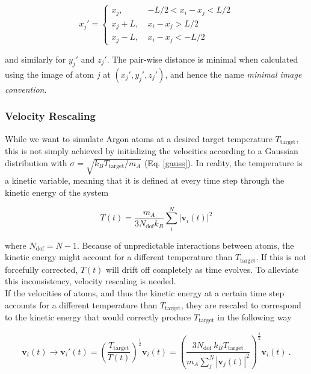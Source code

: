 \documentclass[twocolumn,10pt]{article}
\begin{document}
\begin{equation}
    x_j' = 
    \begin{cases}
        x_j, \quad  &-L/2 < x_i - x_j < L/2 \\
        x_j + L, \ &x_i - x_j > L/2 \\
        x_j - L, &x_i-x_j < -L/2 
    \end{cases}
\end{equation}

\noindent and similarly for $y_j'$ and $z_j'$. The pair-wise distance is minimal when calculated using the image of atom $j$ at $(x_j',y_j',z_j')$, and hence the name \textit{minimal image convention}.

\subsubsection{Velocity Rescaling}

While we want to simulate Argon atoms at a desired target temperature $T_{\text{target}}$, this is not simply achieved by initializing the velocities according to a Gaussian distribution with $\sigma = \sqrt{k_BT_{\text{target}}/m_A}$ (Eq. \eqref{gauss}). In reality, the temperature is a kinetic variable, meaning that it is defined at every time step through the kinetic energy of the system

\begin{equation}
    T(t) = \frac{m_A}{3N_{\text{dof}}k_B}\sum_i^N|\mathbf{v}_i(t)|^2
\end{equation}

\noindent where $N_{\text{dof}} = N-1$. Because of unpredictable interactions between atoms, the kinetic energy might account for a different temperature than $T_{\text{target}}$. If this is not forcefully corrected, $T(t)$ will drift off completely as time evolves. To alleviate this inconsistency, velocity rescaling is needed.\\

If the velocities of atoms, and thus the kinetic energy at a certain time step accounts for a different temperature than $T_{\text{target}}$, they are rescaled to correspond to the kinetic energy that would correctly produce $T_{\text{target}}$ in the following way

\begin{equation}
    \mathbf{v}_i(t) \to \mathbf{v}_i'(t) = \left(\frac{T_{\text{target}}}{T(t)}\right)^{\frac{1}{2}}\mathbf{v}_i(t) = \left(\frac{3N_{\text{dof}} \ k_BT_{\text{target}}}{m_A\sum_j^N|\mathbf{v}_j(t)|^2}\right)^{\frac{1}{2}} \mathbf{v}_i(t) \ .
\end{equation}
\end{document}
